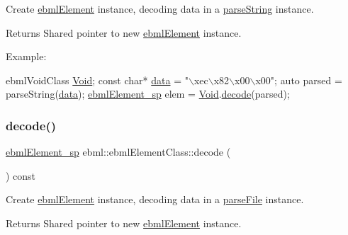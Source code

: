 Create \mbox{\hyperlink{classebml_1_1ebmlElement}{ebml\+Element}} instance, decoding data in a \mbox{\hyperlink{classebml_1_1parseString}{parse\+String}} instance.

\begin{DoxyReturn}{Returns}
Shared pointer to new \mbox{\hyperlink{classebml_1_1ebmlElement}{ebml\+Element}} instance.
\end{DoxyReturn}
Example\+: 
\begin{DoxyCode}
ebmlVoidClass \mbox{\hyperlink{namespaceebml_afbfd509d1cb71e416a07253746e886e9}{Void}};
\textcolor{keyword}{const} \textcolor{keywordtype}{char}* \mbox{\hyperlink{namespaceebml_ab21f8b4ff85186f670f17e84a02d9740}{data}} = \textcolor{stringliteral}{"\(\backslash\)xec\(\backslash\)x82\(\backslash\)x00\(\backslash\)x00"};
\textcolor{keyword}{auto} parsed = parseString(\mbox{\hyperlink{namespaceebml_ab21f8b4ff85186f670f17e84a02d9740}{data}});
\mbox{\hyperlink{namespaceebml_adad533b7705a16bb360fe56380c5e7be}{ebmlElement\_sp}} elem = \mbox{\hyperlink{namespaceebml_afbfd509d1cb71e416a07253746e886e9}{Void}}.\mbox{\hyperlink{classebml_1_1ebmlElementClass_a9de19726c4794e4e3cb1f32e445c5002}{decode}}(parsed);
\end{DoxyCode}
 \mbox{\label{classebml_1_1ebmlElementClass_ab7f46d2ffffadf3b8be8f1d780b15a41}} 
\subsubsection{\texorpdfstring{decode()}{decode()}\hspace{0.1cm}{\footnotesize\ttfamily [2/10]}}
{\footnotesize\ttfamily \mbox{\hyperlink{namespaceebml_adad533b7705a16bb360fe56380c5e7be}{ebml\+Element\+\_\+sp}} ebml\+::ebml\+Element\+Class\+::decode (\begin{DoxyParamCaption}\item[{const \mbox{\hyperlink{classebml_1_1parseFile}{parse\+File}} \&}]{ }\end{DoxyParamCaption}) const}

Create \mbox{\hyperlink{classebml_1_1ebmlElement}{ebml\+Element}} instance, decoding data in a \mbox{\hyperlink{classebml_1_1parseFile}{parse\+File}} instance.

\begin{DoxyReturn}{Returns}
Shared pointer to new \mbox{\hyperlink{classebml_1_1ebmlElement}{ebml\+Element}} instance. 
\end{DoxyReturn}
\mbox{\label{classebml_1_1ebmlElementClass_ac24711e997db80f691a8bff4f610242f}} 
